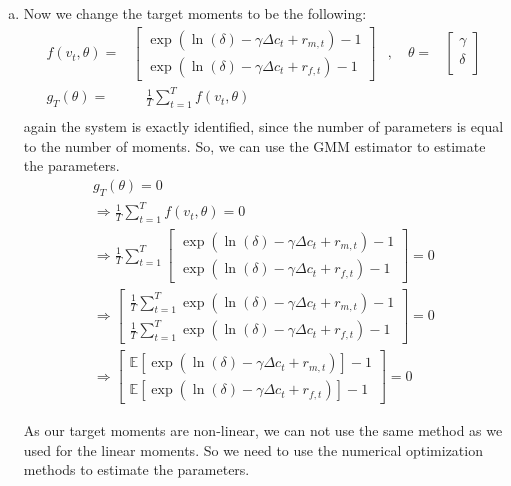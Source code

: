 \begin{enumerate}[(a)]
      \item Now we change the target moments to be the following:
      \begin{equation*}
        \begin{aligned}
          f(v_t,\theta) = & \begin{bmatrix}
            \exp(\ln(\delta) - \gamma\Delta c_t + r_{m,t})-1 \\
            \exp(\ln(\delta) - \gamma\Delta c_t + r_{f,t})-1
          \end{bmatrix} & , \quad 
          \theta = & \begin{bmatrix}
            \gamma \\
            \delta \\
          \end{bmatrix}  \\
          g_T(\theta) = & \quad \frac{1}{T} \sum_{t=1}^T f(v_t,\theta) & \\
        \end{aligned}
        \end{equation*}
        again the system is exactly identified, since the number of parameters is equal to the number of moments. So, we can use the GMM estimator to estimate the parameters.
        \begin{gather*}
          g_T(\theta) = 0\\
          \Rightarrow\frac{1}{T} \sum_{t=1}^T f(v_t,\theta) = 0\\
          \Rightarrow\frac{1}{T} \sum_{t=1}^T \begin{bmatrix}
            \exp(\ln(\delta) - \gamma\Delta c_t + r_{m,t})-1 \\
            \exp(\ln(\delta) - \gamma\Delta c_t + r_{f,t})-1
          \end{bmatrix} = 0\\
          \Rightarrow \begin{bmatrix}
            \frac{1}{T} \sum_{t=1}^T \exp(\ln(\delta) - \gamma\Delta c_t + r_{m,t})-1 \\
            \frac{1}{T} \sum_{t=1}^T \exp(\ln(\delta) - \gamma\Delta c_t + r_{f,t})-1
          \end{bmatrix} = 0\\
          \Rightarrow \begin{bmatrix}
            \mathbb{E} [\exp(\ln(\delta) - \gamma\Delta c_t + r_{m,t})]-1 \\
            \mathbb{E} [\exp(\ln(\delta) - \gamma\Delta c_t + r_{f,t})]-1
          \end{bmatrix} = 0
        \end{gather*}

        As our target moments are non-linear, we can not use the same method as we used for the linear moments. So we need to use the numerical optimization methods to estimate the parameters. 

\end{enumerate}

